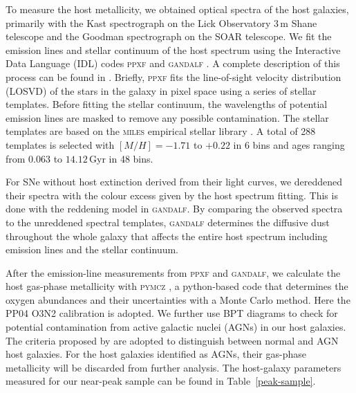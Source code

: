 \documentclass[useAMS,usenatbib]{mn2e}
\begin{document}
To measure the host metallicity, we obtained optical spectra of the host galaxies, primarily with the Kast spectrograph \citep{Kast_spectrograph} on the Lick Observatory 3\,m Shane telescope and the Goodman spectrograph \citep{2004SPIE.5492..331C} on the SOAR telescope. We fit the emission lines and stellar continuum of the host spectrum using the Interactive Data Language (\textsc{IDL}) codes \textsc{ppxf} \citep{2004PASP..116..138C} and \textsc{gandalf} \citep{2006MNRAS.366.1151S}. A complete description of this process can be found in \citet{2014MNRAS.438.1391P}. Briefly, \textsc{ppxf} fits the line-of-sight velocity distribution (LOSVD) of the stars in the galaxy in pixel space using a series of stellar templates. Before fitting the stellar continuum, the wavelengths of potential emission lines are masked to remove any possible contamination.  The stellar templates are based on the \textsc{miles} empirical stellar library \citep{2006MNRAS.371..703S, 2010MNRAS.404.1639V}.  A total of 288 templates is selected with $[M/H]=-1.71$ to $+0.22$ in 6 bins and ages ranging from $0.063$ to $14.12$\,Gyr in 48 bins. 

For SNe without host extinction derived from their light curves, we dereddened their spectra with the colour excess given by the host spectrum fitting. This is done with the reddening model in \textsc{gandalf}. By comparing the observed spectra to the unreddened spectral templates, \textsc{gandalf} determines the diffusive dust throughout the whole galaxy that affects the entire host spectrum including emission lines and the stellar continuum.

After the emission-line measurements from \textsc{ppxf} and \textsc{gandalf}, we calculate the host gas-phase metallicity with \textsc{pymcz} \citep{2016A&C....16...54B}, a python-based code that determines the oxygen abundances and their uncertainties with a Monte Carlo method. Here the PP04 O3N2 calibration \citep{2004MNRAS.348L..59P} is adopted. We further use BPT diagrams \citep*{1981PASP...93....5B} to check for potential contamination from active galactic nuclei (AGNs) in our host galaxies. The criteria proposed by \citet{2001ApJ...556..121K} are adopted to distinguish between normal and AGN host galaxies. For the host galaxies identified as AGNs, their gas-phase metallicity will be discarded from further analysis. The host-galaxy parameters measured for our near-peak sample can be found in Table~\ref{peak-sample}.
\end{document}
